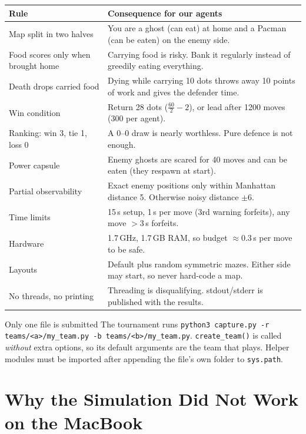 \documentclass[11pt,a4paper]{article}
\begin{document}
\begin{center}
\begin{tabularx}{\linewidth}{@{}lX@{}}
\toprule
\textbf{Rule} & \textbf{Consequence for our agents} \\
\midrule
Map split in two halves & You are a ghost (can eat) at home and a Pacman (can be eaten) on the enemy side. \\
Food scores only when brought home & Carrying food is risky. Bank it regularly instead of greedily eating everything. \\
Death drops carried food & Dying while carrying 10 dots throws away 10 points of work and gives the defender time. \\
Win condition & Return 28 dots ($\tfrac{60}{2}-2$), or lead after 1200 moves (300 per agent). \\
Ranking: win 3, tie 1, loss 0 & A 0--0 draw is nearly worthless. Pure defence is not enough. \\
Power capsule & Enemy ghosts are scared for 40 moves and can be eaten (they respawn at start). \\
Partial observability & Exact enemy positions only within Manhattan distance 5. Otherwise noisy distance $\pm 6$. \\
Time limits & 15\,s setup, 1\,s per move (3rd warning forfeits), any move $>3$\,s forfeits. \\
Hardware & 1.7\,GHz, 1.7\,GB RAM, so budget $\approx 0.3$\,s per move to be safe. \\
Layouts & Default plus random symmetric mazes. Either side may start, so never hard-code a map. \\
No threads, no printing & Threading is disqualifying. stdout/stderr is published with the results. \\
\bottomrule
\end{tabularx}
\end{center}

\begin{keybox}{Only one file is submitted}
The tournament runs \texttt{python3 capture.py -r teams/<a>/my\_team.py -b teams/<b>/my\_team.py}.
\texttt{create\_team()} is called \emph{without} extra options, so its default arguments are the team
that plays. Helper modules must be imported after appending the file's own folder to \texttt{sys.path}.
\end{keybox}

\section{Why the Simulation Did Not Work on the MacBook}
\end{document}
